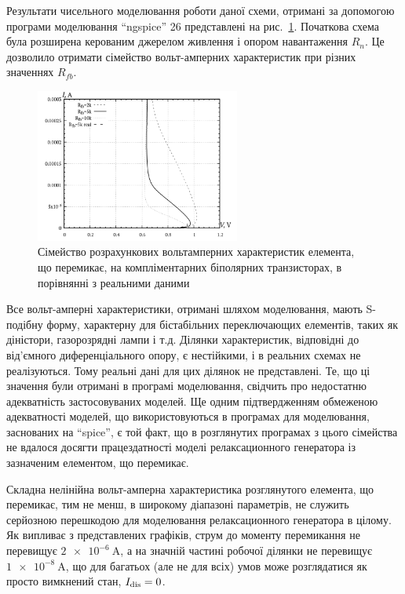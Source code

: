 Результати чисельного моделювання роботи даної схеми, отримані
за допомогою програми моделювання ``ngspice'' 26 представлені на
рис.~\ref{atu:f:relax3d_sw_vah}. Початкова схема була розширена керованим
джерелом живлення і опором навантаження
$ R_n $. Це дозволило отримати сімейство вольт-амперних
характеристик при різних значеннях
$ R_{fb} $.

\begin{figure}[htb!]
  \centerline{\includegraphics[width=0.6\textwidth]{p/relax3d_sw_va.png} }
\caption{Сімейство розрахункових вольтамперних характеристик
елемента, що перемикає, на компліментарних біполярних
транзисторах, в порівнянні з реальними даними}
\label{atu:f:relax3d_sw_vah}
\end{figure}


Все вольт-амперні характеристики, отримані шляхом моделювання,
мають S-подібну форму, характерну для бістабільних переключающих
елементів, таких як діністори, газорозрядні лампи і т.д. Ділянки
характеристик, відповідні до від'ємного диференціального
опору, є нестійкими, і в реальних схемах не реалізуються. Тому
реальні дані для цих ділянок не представлені. Те, що ці значення
були отримані в програмі моделювання, свідчить про недостатню
адекватність застосовуваних моделей. Ще одним підтвердженням
обмеженою адекватності моделей, що використовуються в
програмах для моделювання, заснованих на ``spice'', є той факт, що
в розглянутих програмах з цього сімейства не вдалося досягти
працездатності моделі релаксационного генератора із зазначеним
елементом, що перемикає.


Складна нелінійна вольт-амперна характеристика розглянутого
елемента, що перемикає, тим не менш, в широкому діапазоні
параметрів, не служить серйозною перешкодою для
моделювання релаксационного генератора в цілому. Як випливає
з представлених графіків, струм до моменту перемикання не
перевищує
$ \SI{2 e-6}{\ampere} $, а на значній частині робочої ділянки не перевищує
$ \SI{1e-8}{\ampere} $, що для багатьох (але не для всіх) умов може
розглядатися як просто вимкнений стан,
$ I _\mathrm{dis} = 0 $.

